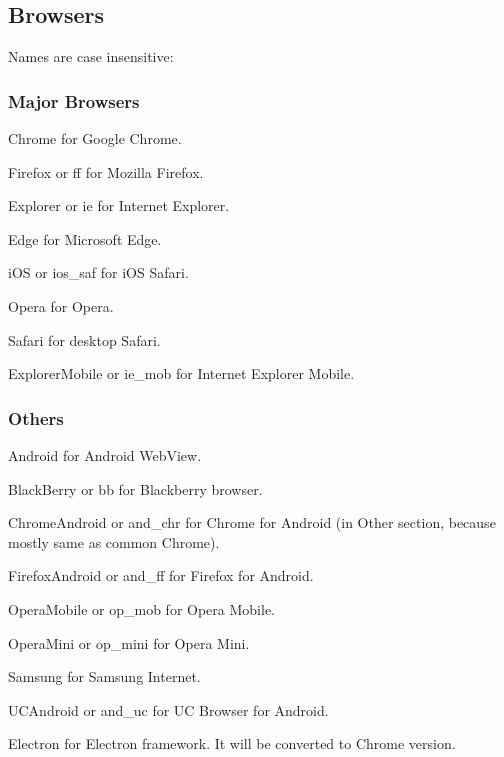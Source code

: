 \subsection*{Browsers}

Names are case insensitive\+:

\subsubsection*{Major Browsers}


\begin{DoxyItemize}
\item {\ttfamily Chrome} for Google Chrome.
\item {\ttfamily Firefox} or {\ttfamily ff} for Mozilla Firefox.
\item {\ttfamily Explorer} or {\ttfamily ie} for Internet Explorer.
\item {\ttfamily Edge} for Microsoft Edge.
\item {\ttfamily i\+OS} or {\ttfamily ios\+\_\+saf} for i\+OS Safari.
\item {\ttfamily Opera} for Opera.
\item {\ttfamily Safari} for desktop Safari.
\item {\ttfamily Explorer\+Mobile} or {\ttfamily ie\+\_\+mob} for Internet Explorer Mobile.
\end{DoxyItemize}

\subsubsection*{Others}


\begin{DoxyItemize}
\item {\ttfamily Android} for Android Web\+View.
\item {\ttfamily Black\+Berry} or {\ttfamily bb} for Blackberry browser.
\item {\ttfamily Chrome\+Android} or {\ttfamily and\+\_\+chr} for Chrome for Android (in Other section, because mostly same as common {\ttfamily Chrome}).
\item {\ttfamily Firefox\+Android} or {\ttfamily and\+\_\+ff} for Firefox for Android.
\item {\ttfamily Opera\+Mobile} or {\ttfamily op\+\_\+mob} for Opera Mobile.
\item {\ttfamily Opera\+Mini} or {\ttfamily op\+\_\+mini} for Opera Mini.
\item {\ttfamily Samsung} for Samsung Internet.
\item {\ttfamily U\+C\+Android} or {\ttfamily and\+\_\+uc} for UC Browser for Android.
\item {\ttfamily Electron} for Electron framework. It will be converted to Chrome version.
\end{DoxyItemize}

